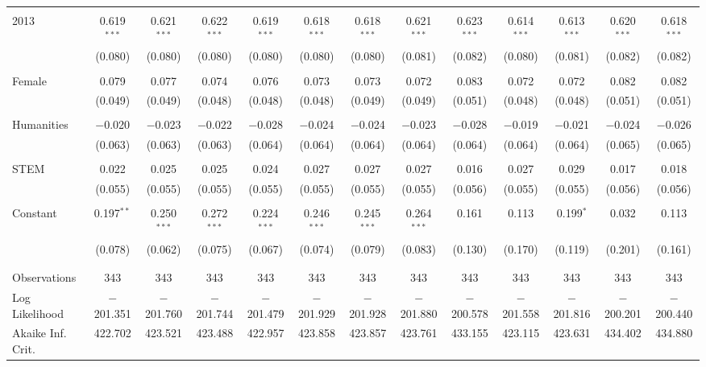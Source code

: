 \begin{table}[H]
\begin{adjustbox}{width=\textwidth}
\begin{tabular}{@{\extracolsep{5pt}}lcccccccccccc}
  & & & & & & & & & & & & \\ 
 2013 & 0.619$^{***}$ & 0.621$^{***}$ & 0.622$^{***}$ & 0.619$^{***}$ & 0.618$^{***}$ & 0.618$^{***}$ & 0.621$^{***}$ & 0.623$^{***}$ & 0.614$^{***}$ & 0.613$^{***}$ & 0.620$^{***}$ & 0.618$^{***}$ \\ 
  & (0.080) & (0.080) & (0.080) & (0.080) & (0.080) & (0.080) & (0.081) & (0.082) & (0.080) & (0.081) & (0.082) & (0.082) \\ 
  & & & & & & & & & & & & \\ 
 Female & 0.079 & 0.077 & 0.074 & 0.076 & 0.073 & 0.073 & 0.072 & 0.083 & 0.072 & 0.072 & 0.082 & 0.082 \\ 
  & (0.049) & (0.049) & (0.048) & (0.048) & (0.048) & (0.049) & (0.049) & (0.051) & (0.048) & (0.048) & (0.051) & (0.051) \\ 
  & & & & & & & & & & & & \\ 
 Humanities & $-$0.020 & $-$0.023 & $-$0.022 & $-$0.028 & $-$0.024 & $-$0.024 & $-$0.023 & $-$0.028 & $-$0.019 & $-$0.021 & $-$0.024 & $-$0.026 \\ 
  & (0.063) & (0.063) & (0.063) & (0.064) & (0.064) & (0.064) & (0.064) & (0.064) & (0.064) & (0.064) & (0.065) & (0.065) \\ 
  & & & & & & & & & & & & \\ 
 STEM & 0.022 & 0.025 & 0.025 & 0.024 & 0.027 & 0.027 & 0.027 & 0.016 & 0.027 & 0.029 & 0.017 & 0.018 \\ 
  & (0.055) & (0.055) & (0.055) & (0.055) & (0.055) & (0.055) & (0.055) & (0.056) & (0.055) & (0.055) & (0.056) & (0.056) \\ 
  & & & & & & & & & & & & \\ 
 Constant & 0.197$^{**}$ & 0.250$^{***}$ & 0.272$^{***}$ & 0.224$^{***}$ & 0.246$^{***}$ & 0.245$^{***}$ & 0.264$^{***}$ & 0.161 & 0.113 & 0.199$^{*}$ & 0.032 & 0.113 \\ 
  & (0.078) & (0.062) & (0.075) & (0.067) & (0.074) & (0.079) & (0.083) & (0.130) & (0.170) & (0.119) & (0.201) & (0.161) \\ 
  & & & & & & & & & & & & \\ 
\hline \\[-1.8ex] 
Observations & 343 & 343 & 343 & 343 & 343 & 343 & 343 & 343 & 343 & 343 & 343 & 343 \\ 
Log Likelihood & $-$201.351 & $-$201.760 & $-$201.744 & $-$201.479 & $-$201.929 & $-$201.928 & $-$201.880 & $-$200.578 & $-$201.558 & $-$201.816 & $-$200.201 & $-$200.440 \\ 
Akaike Inf. Crit. & 422.702 & 423.521 & 423.488 & 422.957 & 423.858 & 423.857 & 423.761 & 433.155 & 423.115 & 423.631 & 434.402 & 434.880 \\ 

\end{tabular}
\end{adjustbox}
\end{table}
